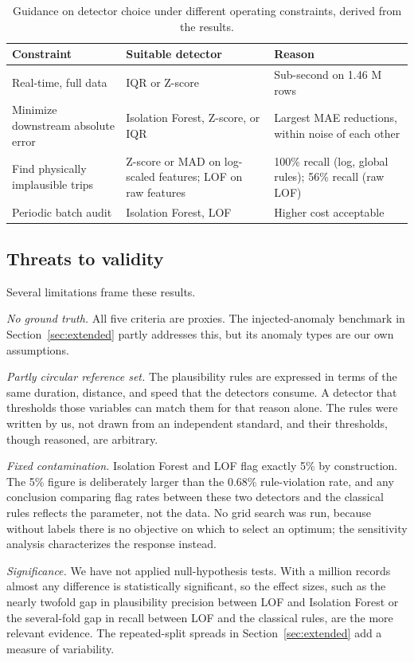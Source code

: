\documentclass{ieeeaccess}
\begin{document}
\begin{table}[!t]
\caption{Guidance on detector choice under different operating constraints, derived from the results.}
\label{tab:guidance}
\centering
\small
\begin{tabular}{p{}p{}p{}}
\hline
Constraint & Suitable detector & Reason \\
\hline
Real-time, full data & IQR or Z-score & Sub-second on 1.46 M rows \\
Minimize downstream absolute error & Isolation Forest, Z-score, or IQR & Largest MAE reductions, within noise of each other \\
Find physically implausible trips & Z-score or MAD on log-scaled features; LOF on raw features & 100\% recall (log, global rules); 56\% recall (raw LOF) \\
Periodic batch audit & Isolation Forest, LOF & Higher cost acceptable \\
\hline
\end{tabular}
\end{table}

\subsection{Threats to validity}
Several limitations frame these results.

\emph{No ground truth.} All five criteria are proxies. The injected-anomaly benchmark in Section~\ref{sec:extended} partly addresses this, but its anomaly types are our own assumptions.

\emph{Partly circular reference set.} The plausibility rules are expressed in terms of the same duration, distance, and speed that the detectors consume. A detector that thresholds those variables can match them for that reason alone. The rules were written by us, not drawn from an independent standard, and their thresholds, though reasoned, are arbitrary.

\emph{Fixed contamination.} Isolation Forest and LOF flag exactly 5\% by construction. The 5\% figure is deliberately larger than the 0.68\% rule-violation rate, and any conclusion comparing flag rates between these two detectors and the classical rules reflects the parameter, not the data. No grid search was run, because without labels there is no objective on which to select an optimum; the sensitivity analysis characterizes the response instead.

\emph{Significance.} We have not applied null-hypothesis tests. With a million records almost any difference is statistically significant, so the effect sizes, such as the nearly twofold gap in plausibility precision between LOF and Isolation Forest or the several-fold gap in recall between LOF and the classical rules, are the more relevant evidence. The repeated-split spreads in Section~\ref{sec:extended} add a measure of variability.
\end{document}
